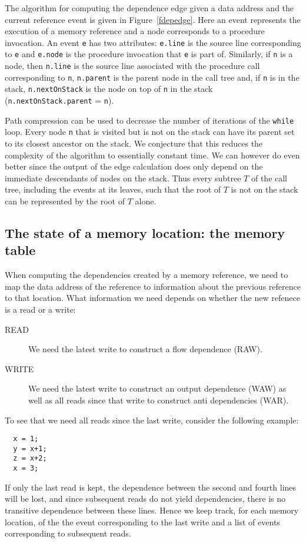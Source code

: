 The algorithm for computing the dependence edge given a data address and 
the current reference event is given in Figure~\ref{fdepedge}. Here an 
event represents the execution of a memory reference and a node corresponds 
to a procedure invocation. An event {\tt e} has two attributes: {\tt e.line} 
is the source line corresponding to {\tt e} and {\tt e.node} is the procedure 
invocation that {\tt e} is part of. Similarly, if {\tt n} is a node, then 
{\tt n.line} is the source line associated with the procedure call 
corresponding to {\tt n}, {\tt n.parent} is the parent node in the call tree 
and, if {\tt n} is in the stack, {\tt n.nextOnStack} is the node on top of 
{\tt n} in the stack ({\tt n.nextOnStack.parent} = {\tt n}).

Path compression \cite{GF64} can be used to decrease the number of iterations 
of the {\tt while} loop.
Every node {\tt n} that is visited but is not on the stack can have its parent set 
to its closest ancestor on the stack. We conjecture that this reduces the 
complexity of the algorithm to essentially constant time. We can however do even 
better since the output of the edge calculation does only depend on the immediate
descendants of nodes on the stack. Thus every subtree $T$ of the call tree, 
including the events at its leaves, such
that the root of $T$ is not on the stack can be represented by the root of $T$
alone.

\subsection{The state of a memory location: the memory table}

When computing the dependencies created by a memory reference, we need to 
map the data address of the reference to information about the previous
reference to that location. What information we need depends on whether 
the new refenece is a read or a write:
\begin{description}
\item[READ]
We need the latest write to construct a flow dependence (RAW).
\item[WRITE]
We need the latest write to construct an output dependence (WAW) as well as
all reads since that write to construct anti dependencies (WAR).
\end{description}
To see that we need all reads since the last write, consider the following
example:
\begin{verbatim}
  x = 1;
  y = x+1;
  z = x+2;
  x = 3;
\end{verbatim}
If only the last read is kept, the dependence between the second and fourth
lines will be lost, and since subsequent reads do not yield dependencies, 
there is no transitive dependence between these lines.
Hence we keep track, for each memory location, of the the event corresponding 
to the last write and a list of events corresponding to subsequent reads.

